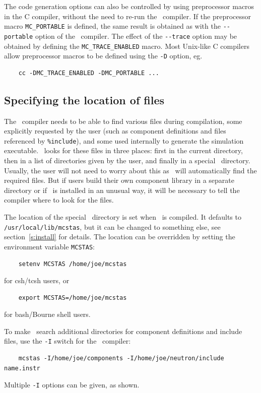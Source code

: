 The code generation options can also be controlled by using preprocessor
macros in the C compiler, without the need to re-run the \MCS\
compiler. If the preprocessor macro \verb+MC_PORTABLE+ is defined, the
same result is obtained as with the \verb+--portable+ option of the
\MCS\ compiler. The effect of the \verb+--trace+ option may be obtained
by defining the \verb+MC_TRACE_ENABLED+ macro. Most Unix-like C
compilers allow preprocessor macros to be defined using the \verb+-D+
option, eg.
\begin{verbatim}
    cc -DMC_TRACE_ENABLED -DMC_PORTABLE ...
\end{verbatim}


\subsection{Specifying the location of files}
\label{s:files}

The \MCS\ compiler needs to be able to find various files during
compilation, some explicitly requested by the user (such as component
definitions and files referenced by \verb+%include+),
and some used internally to generate the simulation executable. \MCS\ looks for these
files in three places: first in the current directory, then in a list of
directories given by the user, and finally in a special \MCS\
directory. Usually, the user will not need to worry about this as \MCS\
will automatically find the required files. But if users build their own
component library in a separate directory or if \MCS\ is installed in an
unusual way, it will be necessary to tell the compiler where to look
for the files.

The location of the special \MCS\ directory is set when \MCS\ is
compiled. It defaults to \verb+/usr/local/lib/mcstas+, but it can be
changed to something else, see section~\ref{s:install} for
details. The location can be overridden by setting the environment
variable \verb+MCSTAS+:
\begin{verbatim}
    setenv MCSTAS /home/joe/mcstas
\end{verbatim}
for csh/tcsh users, or
\begin{verbatim}
    export MCSTAS=/home/joe/mcstas
\end{verbatim}
for bash/Bourne shell users.

To make \MCS\ search additional directories for component definitions
and include files, use the \verb+-I+ switch for the \MCS\ compiler:
\begin{verbatim}
    mcstas -I/home/joe/components -I/home/joe/neutron/include name.instr
\end{verbatim}
Multiple \verb+-I+ options can be given, as shown.


